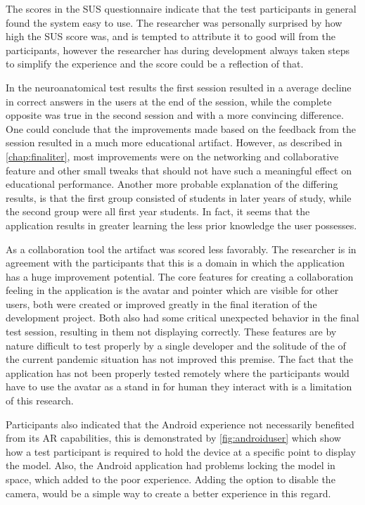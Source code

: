 The scores in the SUS questionnaire indicate that the test participants in general found the system easy to use. The researcher was personally surprised by how high the SUS score was, and is tempted to attribute it to good will from the participants, however the researcher has during development always taken steps to simplify the experience and the score could be a reflection of that.

In the neuroanatomical test results the first session resulted in a average decline in correct answers in the users at the end of the session, while the complete opposite was true in the second session and with a more convincing difference. One could conclude that the improvements made based on the feedback from the session resulted in a much more educational artifact. However, as described in \autoref{chap:finaliter}, most improvements were on the networking and collaborative feature and other small tweaks that should not have such a meaningful effect on educational performance. Another more probable explanation of the differing results, is that the first group consisted of students in later years of study, while the second group were all first year students. In fact, it seems that the application results in greater learning the less prior knowledge the user possesses.

As a collaboration tool the artifact was scored less favorably. The researcher is in agreement with the participants that this is a domain in which the application has a huge improvement potential. The core features for creating a collaboration feeling in the application is the avatar and pointer which are visible for other users, both were created or improved greatly in the final iteration of the development project. Both also had some critical unexpected behavior in the final test session, resulting in them not displaying correctly. These features are by nature difficult to test properly by a single developer and the solitude of the of the current pandemic situation has not improved this premise. The fact that the application has not been properly tested remotely where the participants would have to use the avatar as a stand in for human they interact with is a limitation of this research.

Participants also indicated that the Android experience not necessarily benefited from its AR capabilities, this is demonstrated by \autoref{fig:androiduser} which show how a test participant is required to hold the device at a specific point to display the model. Also, the Android application had problems locking the model in space, which added to the poor experience. Adding the option to disable the camera, would be a simple way to create a better experience in this regard. 

